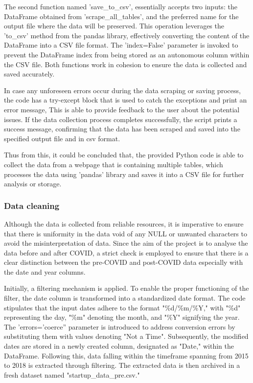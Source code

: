 \documentclass[12pt]{article}
\begin{document}
The second function named 'save\_to\_csv', essentially accepts two inputs: the DataFrame obtained from 'scrape\_all\_tables', and the preferred name for the output file where the data will be preserved. This operation leverages the 'to\_csv' method from the pandas library, effectively converting the content of the DataFrame into a CSV file format. The 'index=False' parameter is invoked to prevent the DataFrame index from being stored as an autonomous column within the CSV file. Both functions work in cohesion to ensure the data is collected and saved accurately.

In case any unforeseen errors occur during the data scraping or saving process, the code has a try-except block that is used to catch the exceptions and print an error message, This is able to provide feedback to the user about the potential issues. If the data collection process completes successfully, the script prints a success message, confirming that the data has been scraped and saved into the specified output file and in csv format.

Thus from this, it could be concluded that, the provided Python code is able to collect the data from a webpage that is containing multiple tables, which processes the data using 'pandas' library and saves it into a CSV file for further analysis or storage.

\subsubsection{Data cleaning}

Although the data is collected from reliable resources, it is imperative to ensure that there is uniformity in the data void of any NULL or unwanted characters to avoid the misinterpretation of data. Since the aim of the project is to analyse the data before and after COVID, a strict check is employed to ensure that there is a clear distinction between the pre-COVID and post-COVID data especially with the date and year columns.

Initially, a filtering mechanism is applied. To enable the proper functioning of the filter, the date column is transformed into a standardized date format. The code stipulates that the input dates adhere to the format "\%d/\%m/\%Y," with "\%d" representing the day, "\%m" denoting the month, and "\%Y" signifying the year. The 'errors='coerce'' parameter is introduced to address conversion errors by substituting them with values denoting "Not a Time". Subsequently, the modified dates are stored in a newly created column, designated as "Date," within the DataFrame. Following this, data falling within the timeframe spanning from 2015 to 2018 is extracted through filtering. The extracted data is then archived in a fresh dataset named "startup\_data\_pre.csv."
\end{document}
